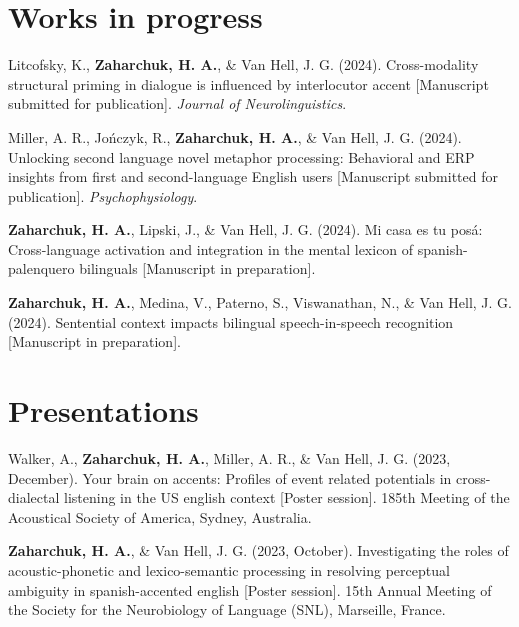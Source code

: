 \documentclass[11pt,a4paper,]{awesome-cv}
\begin{document}
\hypertarget{works-in-progress}{%
\section{Works in progress}\label{works-in-progress}}

\hypertarget{bibliography}{}
\leavevmode{}%
Litcofsky, K., \textbf{\textbf{Zaharchuk, H.} A.}, \& Van Hell, J. G. (2024).
Cross-modality structural priming in dialogue is influenced by
interlocutor accent {[}Manuscript submitted for publication{]}.
\emph{Journal of Neurolinguistics}.

\leavevmode{}%
Miller, A. R., Jończyk, R., \textbf{\textbf{Zaharchuk, H.} A.}, \& Van Hell, J. G. (2024).
Unlocking second language novel metaphor processing: Behavioral and ERP
insights from first and second-language English users {[}Manuscript
submitted for publication{]}. \emph{Psychophysiology}.

\leavevmode{}%
\textbf{\textbf{Zaharchuk, H.} A.}, Lipski, J., \& Van Hell, J. G. (2024). Mi casa es tu
posá: Cross-language activation and integration in the mental lexicon of
spanish-palenquero bilinguals {[}Manuscript in preparation{]}.

\leavevmode{}%
\textbf{\textbf{Zaharchuk, H.} A.}, Medina, V., Paterno, S., Viswanathan, N., \& Van Hell,
J. G. (2024). Sentential context impacts bilingual speech-in-speech
recognition {[}Manuscript in preparation{]}.

\hypertarget{presentations}{%
\section{Presentations}\label{presentations}}

\hypertarget{bibliography}{}
\leavevmode{}%
Walker, A., \textbf{\textbf{Zaharchuk, H.} A.}, Miller, A. R., \& Van Hell, J. G. (2023,
December). Your brain on accents: Profiles of event related potentials
in cross-dialectal listening in the US english context {[}Poster
session{]}. 185th Meeting of the Acoustical Society of America, Sydney,
Australia.

\leavevmode{}%
\textbf{\textbf{Zaharchuk, H.} A.}, \& Van Hell, J. G. (2023, October). Investigating the
roles of acoustic-phonetic and lexico-semantic processing in resolving
perceptual ambiguity in spanish-accented english {[}Poster session{]}.
15th Annual Meeting of the Society for the Neurobiology of Language
(SNL), Marseille, France.
\end{document}
